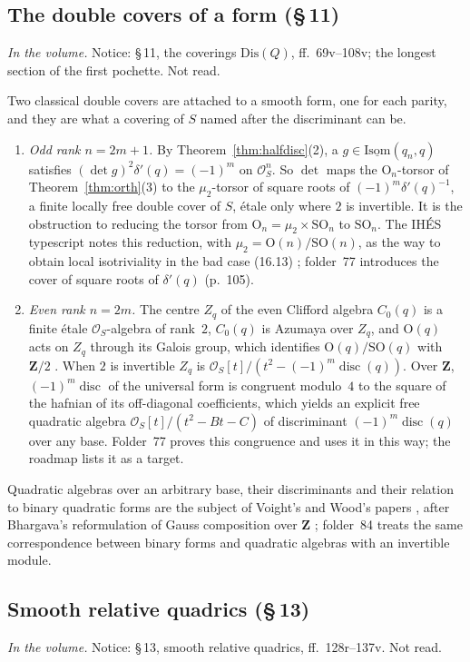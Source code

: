 \documentclass[11pt,a4paper]{amsart}
\newcommand{\cO}{\mathcal{O}}
\newcommand{\Ort}{\mathrm{O}}
\newcommand{\SO}{\mathrm{SO}}
\newcommand{\Isom}{\operatorname{\underline{Isom}}}
\newcommand{\Z}{\mathbf{Z}}
\newcommand{\disc}{\operatorname{disc}}
\newcommand{\status}[1]{\par\smallskip\noindent\textit{In the volume.} #1\par\smallskip}
\theoremstyle{plain}
\theoremstyle{definition}
\begin{document}
\subsection{The double covers of a form (\S\,11)}\label{sub:covers}
\status{Notice: \S\,11, the coverings $\mathrm{Dis}(Q)$, ff.~69v--108v; the longest section of the first pochette. Not read.}
Two classical double covers are attached to a smooth form, one for each parity, and they are what a covering of $S$ named after the discriminant can be.
\begin{enumerate}
\item \emph{Odd rank $n=2m+1$.} By Theorem~\ref{thm:halfdisc}(2), a $g\in\Isom(q_n,q)$ satisfies $(\det g)^2\delta'(q)=(-1)^m$ on $\cO_S^n$. So $\det$ maps the $\Ort_n$-torsor of Theorem~\ref{thm:orth}(3) to the $\mu_2$-torsor of square roots of $(-1)^m\delta'(q)^{-1}$, a finite locally free double cover of $S$, étale only where $2$ is invertible. It is the obstruction to reducing the torsor from $\Ort_n=\mu_2\times\SO_n$ to $\SO_n$. The IHÉS typescript notes this reduction, with $\mu_2=\Ort(n)/\SO(n)$, as the way to obtain local isotriviality in the bad case (16.13) \cite{ihes}; folder~77 introduces the cover of square roots of $\delta'(q)$ (p.~105).
\item \emph{Even rank $n=2m$.} The centre $Z_q$ of the even Clifford algebra $C_0(q)$ is a finite étale $\cO_S$-algebra of rank~$2$, $C_0(q)$ is Azumaya over $Z_q$, and $\Ort(q)$ acts on $Z_q$ through its Galois group, which identifies $\Ort(q)/\SO(q)$ with $\Z/2$ \cite[Prop.~C.2.2 and \S\,C.2]{conrad}. When $2$ is invertible $Z_q$ is $\cO_S[t]/(t^2-(-1)^m\disc(q))$. Over $\Z$, $(-1)^m\disc$ of the universal form is congruent modulo~$4$ to the square of the hafnian of its off-diagonal coefficients, which yields an explicit free quadratic algebra $\cO_S[t]/(t^2-Bt-C)$ of discriminant $(-1)^m\disc(q)$ over any base. Folder~77 proves this congruence and uses it in this way; the roadmap \cite{roadmap} lists it as a target.
\end{enumerate}
Quadratic algebras over an arbitrary base, their discriminants and their relation to binary quadratic forms are the subject of Voight's and Wood's papers \cite{voight2016, wood}, after Bhargava's reformulation of Gauss composition over $\Z$ \cite{bhargava}; folder~84 treats the same correspondence between binary forms and quadratic algebras with an invertible module.

\subsection{Smooth relative quadrics (\S\,13)}\label{sub:smooth}
\status{Notice: \S\,13, smooth relative quadrics, ff.~128r--137v. Not read.}
\end{document}
